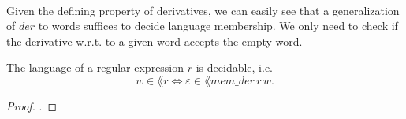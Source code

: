         \paragraph{} 
        Given the defining property of derivatives, we can easily see that a generalization of $der$ to words suffices to decide language membership. We only need to check if the derivative w.r.t. to a given word accepts the empty word.


        \begin{theorem}
            \label{mem_der_correct} 
            The language of a regular expression $r$ is decidable, i.e.
            \begin{equation*}     w \in \lang{r} \Leftrightarrow \varepsilon \in \lang{mem\_der \, r \, w}.      \end{equation*}
            \end{theorem}
            \begin{proof}
                .
            \end{proof}



